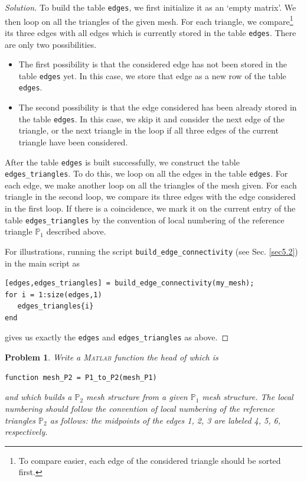 \documentclass[11pt,a4paper,center,notitlepage]{article}
\numberwithin{equation}{section}
\newtheorem{prob}{Problem}[section]
\begin{document}
\begin{proof}[Solution] 
To build the table \verb|edges|, we first initialize it as an `empty matrix'. We then loop on all the triangles of the given mesh. For each triangle, we compare\footnote{To compare easier, each edge of the considered triangle should be sorted first.} its three edges with all edges which is currently stored in the table \verb|edges|. There are only two possibilities. 
\begin{itemize}
\item The first possibility is that the considered edge has not been stored in the table \verb|edges| yet. In this case, we store that edge as a new row of the table \verb|edges|.
\item The second possibility is that the edge considered has been already stored in the table \verb|edges|. In this case, we skip it and consider the next edge of the triangle, or the next triangle in the loop if all three edges of the current triangle have been considered.
\end{itemize}
After the table \verb|edges| is built successfully, we construct the table \verb|edges_triangles|. To do this, we loop on all the edges in the table \verb|edges|. For each edge, we make another loop on all the triangles of the mesh given. For each triangle in the second loop, we compare its three edges with the edge considered in the first loop. If there is a coincidence, we mark it on the current entry of the table \verb|edges_triangles| by the convention of local numbering of the reference triangle $\mathbb{P}_1$ described above.

For illustrations, running the script \verb|build_edge_connectivity| (see Sec. \ref{sec5.2}) in the main script as
\begin{verbatim}
[edges,edges_triangles] = build_edge_connectivity(my_mesh);
for i = 1:size(edges,1)
   edges_triangles{i} 
end
\end{verbatim}
gives us exactly the \verb|edges| and \verb|edges_triangles| as above.
\end{proof}

\begin{prob}
Write a \textsc{Matlab} function the head of which is
\begin{verbatim}
function mesh_P2 = P1_to_P2(mesh_P1)
\end{verbatim}
and which builds a $\mathbb{P}_2$ mesh structure from a given $\mathbb{P}_1$ mesh structure. The local numbering should follow the convention of local numbering of the reference triangles $\mathbb{P}_2$ as follows: the midpoints of the edges 1, 2, 3 are labeled 4, 5, 6, respectively.
\end{prob}
\end{document}
